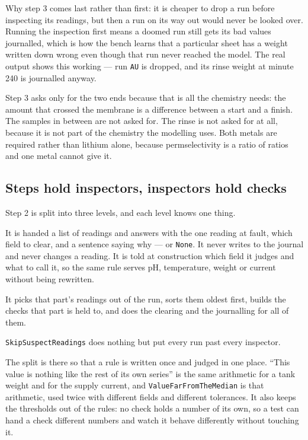 Why step 3 comes last rather than first: it is cheaper to drop a run before inspecting its
readings, but then a run on its way out would never be looked over. Running the inspection
first means a doomed run still gets its bad values journalled, which is how the bench learns
that a particular sheet has a weight written down wrong even though that run never reached the
model. The real output shows this working --- run \texttt{AU} is dropped, and its rinse weight
at minute 240 is journalled anyway.

Step 3 asks only for the two ends because that is all the chemistry needs: the amount that
crossed the membrane is a difference between a start and a finish. The samples in between are
not asked for. The rinse is not asked for at all, because it is not part of the chemistry the
modelling uses. Both metals are required rather than lithium alone, because
permselectivity is a ratio of ratios and one metal cannot give it.

\subsection{Steps hold inspectors, inspectors hold checks}

Step 2 is split into three levels, and each level knows one thing.

\begin{description}[nosep,style=nextline]
  \item[A \texttt{Check} is a rule, and nothing else.] It is handed a list of readings and
        answers with the one reading at fault, which field to clear, and a sentence saying
        why --- or \texttt{None}. It never writes to the journal and never changes a reading.
        It is told at construction which field it judges and what to call it, so the same rule
        serves pH, temperature, weight or current without being rewritten.
  \item[An \texttt{Inspector} owns one part of a run.] It picks that part's readings out of the
        run, sorts them oldest first, builds the checks that part is held to, and does the
        clearing and the journalling for all of them.
  \item[The \texttt{Step} owns the loop over runs.] \texttt{SkipSuspectReadings} does nothing
        but put every run past every inspector.
\end{description}

The split is there so that a rule is written once and judged in one place. ``This value is
nothing like the rest of its own series'' is the same arithmetic for a tank weight and for the
supply current, and \texttt{ValueFarFromTheMedian} is that arithmetic, used twice with
different fields and different tolerances. It also keeps the thresholds out of the rules: no
check holds a number of its own, so a test can hand a check different numbers and watch it
behave differently without touching it.

